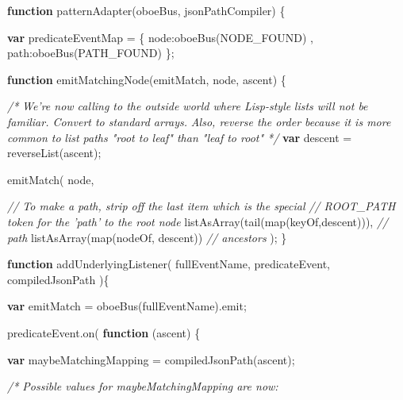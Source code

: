 \documentclass[12pt, ]{article}
\newenvironment{Shaded}{}{}
\newcommand{\KeywordTok}[1]{\textcolor[rgb]{0.00,0.44,0.13}{\textbf{{#1}}}}
\newcommand{\DataTypeTok}[1]{\textcolor[rgb]{0.56,0.13,0.00}{{#1}}}
\newcommand{\CommentTok}[1]{\textcolor[rgb]{0.38,0.63,0.69}{\textit{{#1}}}}
\newcommand{\OtherTok}[1]{\textcolor[rgb]{0.00,0.44,0.13}{{#1}}}
\newcommand{\FunctionTok}[1]{\textcolor[rgb]{0.02,0.16,0.49}{{#1}}}
\newcommand{\NormalTok}[1]{{#1}}
\begin{document}
\begin{Shaded}
\begin{Highlighting}[]
\KeywordTok{function} \FunctionTok{patternAdapter}\NormalTok{(oboeBus, jsonPathCompiler) \{}

   \KeywordTok{var} \NormalTok{predicateEventMap = \{}
      \DataTypeTok{node}\NormalTok{:}\FunctionTok{oboeBus}\NormalTok{(NODE_FOUND)}
   \NormalTok{,  }\DataTypeTok{path}\NormalTok{:}\FunctionTok{oboeBus}\NormalTok{(PATH_FOUND)}
   \NormalTok{\};}
     
   \KeywordTok{function} \FunctionTok{emitMatchingNode}\NormalTok{(emitMatch, node, ascent) \{}
         
      \CommentTok{/* }
\CommentTok{         We're now calling to the outside world where Lisp-style }
\CommentTok{         lists will not be familiar. Convert to standard arrays. }
\CommentTok{   }
\CommentTok{         Also, reverse the order because it is more common to }
\CommentTok{         list paths "root to leaf" than "leaf to root"  */}
      \KeywordTok{var} \NormalTok{descent     = }\FunctionTok{reverseList}\NormalTok{(ascent);}
                
      \FunctionTok{emitMatch}\NormalTok{(}
         \NormalTok{node,}
         
         \CommentTok{// To make a path, strip off the last item which is the special}
         \CommentTok{// ROOT_PATH token for the 'path' to the root node          }
         \FunctionTok{listAsArray}\NormalTok{(}\FunctionTok{tail}\NormalTok{(}\FunctionTok{map}\NormalTok{(keyOf,descent))),  }\CommentTok{// path}
         \FunctionTok{listAsArray}\NormalTok{(}\FunctionTok{map}\NormalTok{(nodeOf, descent))       }\CommentTok{// ancestors    }
      \NormalTok{);         }
   \NormalTok{\}}

   \KeywordTok{function} \FunctionTok{addUnderlyingListener}\NormalTok{( fullEventName, predicateEvent, compiledJsonPath )\{}
   
      \KeywordTok{var} \NormalTok{emitMatch = }\FunctionTok{oboeBus}\NormalTok{(fullEventName).}\FunctionTok{emit}\NormalTok{;}
   
      \OtherTok{predicateEvent}\NormalTok{.}\FunctionTok{on}\NormalTok{( }\KeywordTok{function} \NormalTok{(ascent) \{}

         \KeywordTok{var} \NormalTok{maybeMatchingMapping = }\FunctionTok{compiledJsonPath}\NormalTok{(ascent);}

         \CommentTok{/* Possible values for maybeMatchingMapping are now:}


\end{Highlighting}
\end{Shaded}
\end{document}
